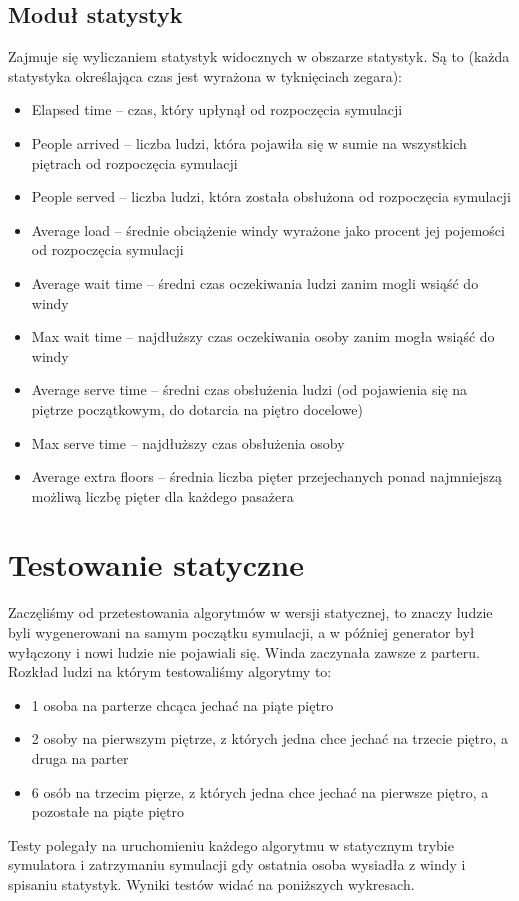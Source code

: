 \documentclass[a4paper,11pt]{article}
\begin{document}
\subsection{Moduł statystyk}
Zajmuje się wyliczaniem statystyk widocznych w obszarze statystyk. Są to (każda statystyka określająca czas jest wyrażona w tyknięciach zegara):
\begin{itemize}
	\item Elapsed time -- czas, który upłynął od rozpoczęcia symulacji
	\item People arrived -- liczba ludzi, która pojawiła się w sumie na wszystkich piętrach od rozpoczęcia symulacji
	\item People served -- liczba ludzi, która została obsłużona od rozpoczęcia symulacji
	\item Average load -- średnie obciążenie windy wyrażone jako procent jej pojemości od rozpoczęcia symulacji
	\item Average wait time -- średni czas oczekiwania ludzi zanim mogli wsiąść do windy
	\item Max wait time -- najdłuższy czas oczekiwania osoby zanim mogła wsiąść do windy
	\item Average serve time -- średni czas obsłużenia ludzi (od pojawienia się na piętrze początkowym, do dotarcia na piętro docelowe)
	\item Max serve time -- najdłuższy czas obsłużenia osoby
	\item Average extra floors -- średnia liczba pięter przejechanych ponad najmniejszą możliwą liczbę pięter dla każdego pasażera
\end{itemize}

\section{Testowanie statyczne}
Zaczęliśmy od przetestowania algorytmów w wersji statycznej, to znaczy ludzie byli wygenerowani na samym początku symulacji, a w później generator był wyłączony i nowi ludzie nie pojawiali się. Winda zaczynała zawsze z parteru. Rozkład ludzi na którym testowaliśmy algorytmy to:
\begin{itemize}
\item 1 osoba na parterze chcąca jechać na piąte piętro
\item 2 osoby na pierwszym piętrze, z których jedna chce jechać na trzecie piętro, a druga na parter
\item 6 osób na trzecim pięrze, z których jedna chce jechać na pierwsze piętro, a pozostałe na piąte piętro
\end{itemize}
\noindent
Testy polegały na uruchomieniu każdego algorytmu w statycznym trybie symulatora i zatrzymaniu symulacji gdy ostatnia osoba wysiadła z windy i spisaniu statystyk. Wyniki testów widać na poniższych wykresach.
\end{document}
